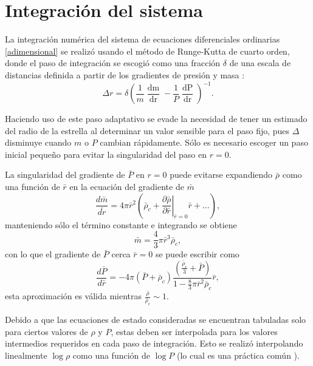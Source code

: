 \section{Integración del sistema}

La integración numérica del sistema de ecuaciones diferenciales ordinarias \eqref{adimensional} se realizó usando el método de Runge-Kutta de cuarto orden, donde el paso de integración se escogió como una fracción $\delta$ de una escala de distancias definida a partir de los gradientes de presión y masa \cite{Baym1971}: 
\begin{equation}\label{adaptivestep}
    \Delta{r} = \delta \left( \frac { 1 } { m } \frac { \mathop{dm} } { \mathop{dr}  } - \frac { 1 } { P } \frac { \mathop{dP}  } { \mathop{dr} } \right) ^ { - 1 }.
\end{equation}

Haciendo uso de este paso adaptativo se evade la necesidad de tener un estimado del radio de la estrella al determinar un valor sensible para el paso fijo, pues $\Delta$ disminuye cuando $m$ o $P$ cambian rápidamente. Sólo es necesario escoger un paso inicial pequeño para evitar la singularidad del paso en $r=0$.

La singularidad del gradiente de $\bar{P}$ en $r=0$ puede evitarse expandiendo $\bar{\rho}$ como una función de $\bar{r}$ en la ecuación del gradiente de $\bar{m}$
\begin{equation*}
    \frac{d\bar{m}}{\bar{dr}}=4\pi \bar{r}^2 \left(  \bar{\rho} _ { c } + \left. \frac { \partial \bar{\rho }} { \partial \bar{r} } \right| _ { \bar{r} = 0 } \bar{r} + \ldots \right),
\end{equation*}
manteniendo sólo el término constante e integrando se obtiene
\begin{equation*}
    \bar{m}  =  \frac { 4 } { 3 } \pi \bar{r} ^ { 3 } \bar{\rho} _ { c },
\end{equation*}
con lo que el gradiente de $\bar{P}$ cerca $\bar{r}=0$ se puede escribir como
\begin{equation}
    \frac{d\bar{P}}{d\bar{r}} = -4\pi (\bar{P}+\bar{\rho}_c)\frac{\left(\frac{\bar{\rho}_c}{3}+\bar{P}\right)}{1-\frac{8}{3}\pi\bar{r}^2\bar{\rho}_c} \bar{r},
\end{equation}
esta aproximación es válida mientras $ \frac{\bar{\rho}}{\bar{\rho}_{c}} \sim 1$.

Debido a que las ecuaciones de estado consideradas se encuentran tabuladas solo para ciertos valores de $\rho$ y $P$, estas deben ser interpolada para los valores intermedios requeridos en cada paso de integración. Esto se realizó interpolando linealmente $\log{\rho}$ como una función de $\log{P}$ (lo cual es una práctica común \cite{Haensel2007}).


